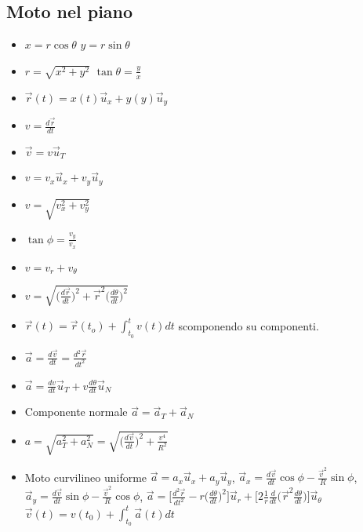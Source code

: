 	\subsection{Moto nel piano}
	\begin{itemize}
		\item $x = r\cos\theta$ $y = r \sin \theta$
		\item $r = \sqrt{x^2+y^2}$ $\tan\theta=\frac{y}{x}$
		\item $\overrightarrow{r}(t)=x(t)\overrightarrow{u}_x + y(y)\overrightarrow{u}_y$
		\item $v = \frac{d\overrightarrow{r}}{dt}$
		\item $\overrightarrow{v} = v\overrightarrow{u}_T$
		\item $v=v_x\overrightarrow{u}_x+v_y\overrightarrow{u}_y$
		\item $v = \sqrt{v_x^2+v_y^2}$
		\item $\tan\phi = \frac{v_y}{v_x}$
		\item $v = v_r+v_\theta$
		\item $v = \sqrt{\bigl(\frac{d\overrightarrow{r}}{dt}\bigr)^2 + \overrightarrow{r}^2\bigl(\frac{d\theta}{dt}\bigr)^2}$
		\item $\overrightarrow{r}(t)=\overrightarrow{r}(t_o)+\int_{t_0}^tv(t)dt$ scomponendo su componenti.
		\item $\overrightarrow{a} = \frac{d\overrightarrow{v}}{dt}=\frac{d^2\overrightarrow{r}}{dt^2}$
		\item $\overrightarrow{a} = \frac{dv}{dt}\overrightarrow{u}_T + v\frac{d\theta}{dt}\overrightarrow{u}_N$
		\item Componente normale $\overrightarrow{a} = \overrightarrow{a}_T+\overrightarrow{a}_N$
		\item $a = \sqrt{a^2_T+a^2_N} = \sqrt{\bigl(\frac{d\overrightarrow{v}}{dt}\bigr)^2+\frac{v^4}{R^2}}$
		\item Moto curvilineo uniforme $\overrightarrow{a} = a_x\overrightarrow{u}_x+a_y\overrightarrow{u}_y$, $\overrightarrow{a}_x = \frac{d\overrightarrow{v}}{dt}\cos\phi - \frac{\overrightarrow{v}^2}{R}\sin\phi$, $\overrightarrow{a}_y = \frac{d\overrightarrow{v}}{dt}\sin\phi - \frac{\overrightarrow{v}^2}{R}\cos\phi$, $\overrightarrow{a} = \bigl[\frac{d^2\overrightarrow{r}}{dt^2}-r\bigl(\frac{d\theta}{dt}\bigr)^2\bigr]\overrightarrow{u}_r+\bigl[2\frac{1}{r}\frac{d}{dt}\bigl(\overrightarrow{r}^2\frac{d\theta}{dt}\bigr)\bigr]\overrightarrow{u}_\theta$ $\overrightarrow{v}(t) = v(t_0)+\int_{t_0}^t\overrightarrow{a}(t)dt$
	\end{itemize}
